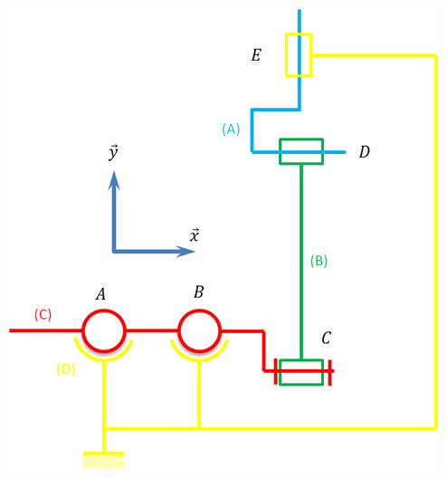 \documentclass[10pt]{article}
\begin{document}
\begin{minipage}[c]{.31\linewidth}
\begin{center}
\includegraphics[width=.95\textwidth]{images/micromoteur}
\end{center}
\end{minipage}\hfill
\begin{minipage}[c]{.3\linewidth}
\begin{center}
\end{center}
\end{minipage}\hfill
\end{document}
